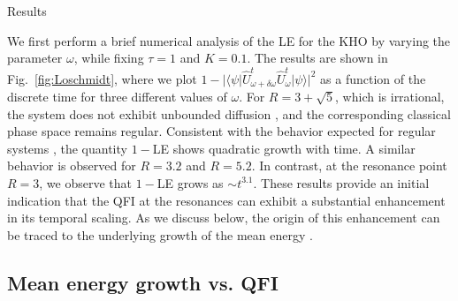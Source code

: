 \documentclass[amsmath,nobibnotes,aps,amssymb,pra, prl,aps,showpacs,superscriptaddress,twocolumn, longbibliography, reprint]{revtex4-2}
\begin{document}
\begin{section}{Results}


We first perform a brief numerical analysis of the LE for the KHO by varying the parameter $\omega$, while fixing $\tau=1$ and $K=0.1$. The results are shown in Fig.~\ref{fig:Loschmidt}, where we plot $1-|\langle\psi|\hat{U}_{\omega+\delta\omega}^{t}\hat{U}_{\omega}^{t}|\psi\rangle|^2$ as a function of the discrete time for three different values of $\omega$. For $R=3+\sqrt{5}$, which is irrational, the system does not exhibit unbounded diffusion \cite{frasca1997quantum}, and the corresponding classical phase space remains regular. Consistent with the behavior expected for regular systems \cite{prosen2002stability}, the quantity $1-$LE shows quadratic growth with time. A similar behavior is observed for $R=3.2$ and $R=5.2$. In contrast, at the resonance point $R=3$, we observe that $1-$LE grows as $\sim t^{3.1}$.
These results provide an initial indication that the QFI at the resonances can exhibit a substantial enhancement in its temporal scaling. As we discuss below, the origin of this enhancement can be traced to the underlying growth of the mean energy \cite{pang2017optimal}. 


\subsection{Mean energy growth vs. QFI}
\label{section-3B}


\end{section}
\end{document}
